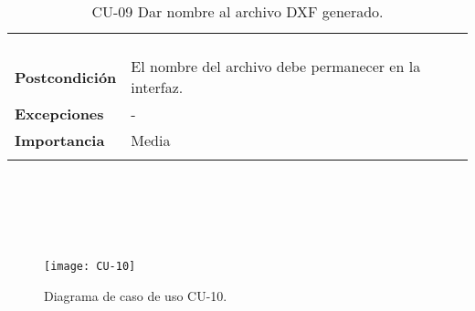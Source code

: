 \begin{longtable}[H]{@{}ll@{}}
\begin{minipage}[t]{0.71\columnwidth}
\begin{enumerate}
\end{enumerate}\strut
\end{minipage}\tabularnewline
\begin{minipage}[t]{0.23\columnwidth}\raggedright\strut
\textbf{Postcondición}\strut
\end{minipage} & \begin{minipage}[t]{0.71\columnwidth}\raggedright\strut
El nombre del archivo debe permanecer en la interfaz.
\end{minipage}\tabularnewline
\begin{minipage}[t]{0.23\columnwidth}\raggedright\strut
\textbf{Excepciones}\strut
\end{minipage} & \begin{minipage}[t]{0.71\columnwidth}\raggedright\strut
-\strut
\end{minipage}\tabularnewline
\begin{minipage}[t]{0.23\columnwidth}\raggedright\strut
\textbf{Importancia}\strut
\end{minipage} & \begin{minipage}[t]{0.71\columnwidth}\raggedright\strut
Media\strut
\end{minipage}\tabularnewline
\bottomrule
\caption{CU-09 Dar nombre al archivo DXF generado.}
\end{longtable}
\strut
\\
\\
\\
\\
\begin{figure}[H]
	\centering
	\texttt{[image: CU-10]}
	\caption{Diagrama de caso de uso CU-10.}
	\label{fig:CU-10}
\end{figure}


